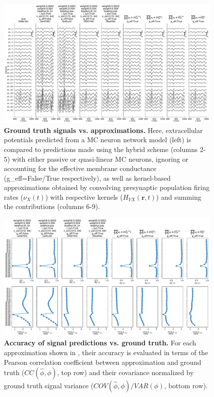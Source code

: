 \begin{figure}[!ht]
\begin{center}
\includegraphics[width=\textwidth]{Figures/Ch-LFPy/Ch-LFPy-signal_vs_predictions.pdf}
\end{center}
\caption{\textbf{Ground truth signals vs. approximations.}
Here, extracellular potentials predicted from a MC neuron network model (left) is compared to predictions made using the hybrid scheme (columns 2-5)
with either passive or quasi-linear MC neurons,
ignoring or accounting for the effective membrane conductance (g\_eff=False/True respectively),
as well as kernel-based approximations obtained by convolving presynaptic population firing rates ($\nu_X(t)$) with respective kernels ($H_{YX}(\mathbf{r}, t)$) and summing the contributions (columns 6-9).
}
\label{fig:LFPy_predictions}
\end{figure}


\begin{figure}[!ht]
\begin{center}
\includegraphics[width=\textwidth]{Figures/Ch-LFPy/Ch-LFPy-correlations.pdf}
\end{center}
\caption{\textbf{Accuracy of signal predictions vs. ground truth.}
For each approximation shown in ,
their accuracy is evaluated in terms of the Pearson correlation coefficient between approximation and ground truth ($CC(\hat{\phi}, \phi)$, top row) and
their covariance normalized by ground truth signal variance ($COV(\hat{\phi}, \phi)/VAR(\phi)$, bottom row).
}
\label{fig:LFPy_correlations}
\end{figure}



